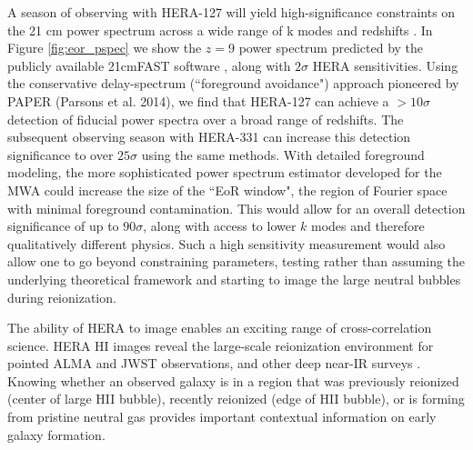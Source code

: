 \documentclass[ars]{/Users/daviddeboer1/Documents/Papers/Copernicus_LaTeX_Package_v_2_7/copernicus}
\begin{document}
A season of observing with HERA-127 will yield high-significance constraints on the
21 cm power spectrum across a wide range of k modes and redshifts
\citep{pober_et_al2014}. In Figure \ref{fig:eor_pspec} we show the $z=9$ power
spectrum predicted by the publicly available 21cmFAST software
\citep{mesinger_et_al2011}, along with $2\sigma$ HERA sensitivities. Using the
conservative delay-spectrum (``foreground avoidance") approach pioneered by PAPER
(Parsons et al. 2014), we find that HERA-127 can achieve a $> 10\sigma$ detection of
fiducial power spectra over a broad range of redshifts. The subsequent observing
season with HERA-331 can increase this detection significance to over $25\sigma$
using the same methods. With detailed foreground modeling, the more sophisticated
power spectrum estimator developed for the MWA could increase the size of the ``EoR
window", the region of Fourier space with minimal foreground contamination. This
would allow for an overall detection significance of up to $90\sigma$, along with
access to lower $k$ modes and therefore qualitatively different physics. Such a high
sensitivity measurement would also allow one to go beyond constraining parameters,
testing rather than assuming the underlying theoretical framework and starting to
image the large neutral bubbles during reionization.

%

The ability of HERA to image enables an exciting range of cross-correlation science.
HERA HI images reveal the large-scale reionization environment for pointed ALMA and
JWST observations, and other deep near-IR surveys \citep{lidz_et_al2009}. Knowing
whether an observed galaxy is in a region that was previously reionized (center of
large HII bubble), recently reionized (edge of HII bubble), or is forming from
pristine neutral gas provides important contextual information on early galaxy
formation.
\end{document}
